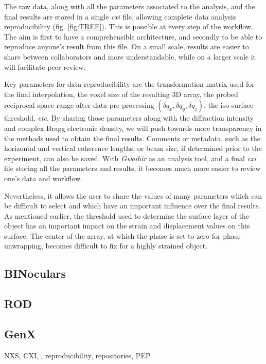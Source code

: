 The raw data, along with all the parameters associated to the analysis, and the final results are stored in a single \textit{cxi} file, allowing complete data analysis reproducibility (fig. \ref{fig:TREE}). This is possible at every step of the workflow. The aim is first to have a comprehensible architecture, and secondly to be able to reproduce anyone's result from this file. On a small scale, results are easier to share between collaborators and more understandable, while on a larger scale it will facilitate peer-review.

Key parameters for data reproducibility are the transformation matrix used for the final interpolation, the voxel size of the resulting 3D array, the probed reciprocal space range after data pre-processing $(\delta q_x , \delta q_y , \delta q_z)$, the iso-surface threshold, \textit{etc}. By sharing those parameters along with the diffraction intensity and complex Bragg electronic density, we will push towards more transparency in the methods used to obtain the final results.
Comments or metadata, such as the horizontal and vertical coherence lengths, or beam size, if determined prior to the experiment, can also be saved.
With \textit{Gwaihir} as an analysis tool, and a final \textit{cxi} file storing all the parameters and results, it becomes much more easier to review one's data and workflow.

Nevertheless, it allows the user to share the values of many parameters which can be difficult to select and which have an important influence over the final results. As mentioned earlier, the threshold used to determine the surface layer of the object has an important impact on the strain and displacement values on this surface. The center of the array, at which the phase is set to zero for phase unwrapping, becomes difficult to fix for a highly strained object.


\subsection{BINoculars} \label{sec:BINoculars}

\subsection{ROD} \label{sec:ROD}

\subsection{GenX} \label{sec:GenX}


\textcolor{Important}{
NXS, CXI, , reproducibility, repositories, PEP
}